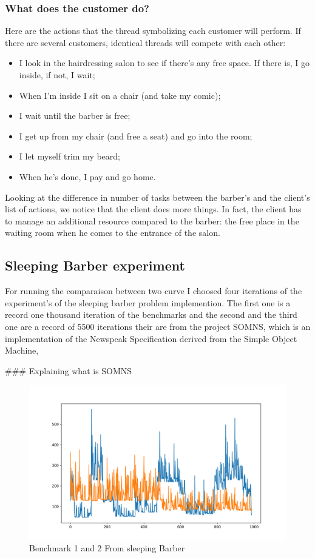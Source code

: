 \documentclass{article}
\begin{document}
\subsubsection{ What does the customer do?}

Here are the actions that the thread symbolizing each customer will perform. If there are several customers, identical threads will compete with each other:

\begin{itemize}
    \item I look in the hairdressing salon to see if there's any free space. If there is, I go inside, if not, I wait;
    \item When I'm inside I sit on a chair (and take my comic);
    \item I wait until the barber is free;
    \item I get up from my chair (and free a seat) and go into the room;
    \item I let myself trim my beard;
    \item When he's done, I pay and go home.
\end{itemize}

Looking at the difference in number of tasks between the barber's and the client's list of actions, we notice that the client does more things. In fact, the client has to manage an additional resource compared to the barber: the free place in the waiting room when he comes to the entrance of the salon.

\subsection{ Sleeping Barber experiment}

For running the comparaison between two curve I choosed four iterations of the experiment's of the sleeping barber problem implemention. The first one is a record one thousand iteration of the benchmarks and the second and the third one are a record of 5500 iterations their are from the project SOMNS, which is an implementation of the Newspeak Specification derived from the Simple Object Machine,

\#\#\# Explaining what is SOMNS

\begin{figure}[h!]
    \centering
    \includegraphics[width=1\textwidth]{plot_0.png}
    \caption{Benchmark 1 and 2 From sleeping Barber}
    \label{fig:bench_1_2}
\end{figure}
\end{document}
